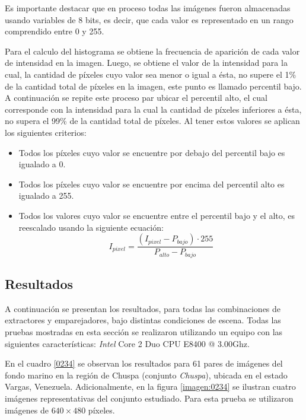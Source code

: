 Es importante destacar que en proceso todas las imágenes fueron almacenadas usando variables de 8 bits, es decir, que cada valor es representado en un rango comprendido entre 0 y 255.

Para el calculo del histograma se obtiene la frecuencia de aparición de cada valor de intensidad en la imagen. Luego, se obtiene el valor de la intensidad para la cual, la cantidad de píxeles cuyo valor sea menor o igual a ésta, no supere el 1\% de la cantidad total de píxeles en la imagen, este punto es llamado percentil bajo. A continuación se repite este proceso par ubicar el percentil alto, el cual corresponde con la intensidad para la cual la cantidad de píxeles inferiores a ésta, no supera el 99\% de la cantidad total de píxeles. Al tener estos valores se aplican los siguientes criterios:

\begin{itemize}
	\item Todos los píxeles cuyo valor se encuentre por debajo del percentil bajo es igualado a 0.
	\item Todos los píxeles cuyo valor se encuentre por encima del percentil alto es igualado a 255.
	\item Todos los valores cuyo valor se encuentre entre el percentil bajo y el alto, es reescalado usando la siguiente ecuación: 
	\begin{displaymath}
		I_{pixel} = \frac{(I_{pixel} - P_{bajo}) \cdot 255}{P_{alto} - P_{bajo}}
	\end{displaymath}
\end{itemize}


\subsection{Resultados}

A continuación se presentan los resultados, para todas las combinaciones de extractores y emparejadores, bajo distintas condiciones de escena. Todas las pruebas mostradas en esta sección se realizaron utilizando un equipo con las siguientes características:  \textit{Intel\textsuperscript \textregistered } Core 2 Duo CPU E8400 @ 3.00Ghz.

En el cuadro \ref{0234} se observan los resultados para 61 pares de imágenes del fondo marino en la región de Chuspa (conjunto \textit{Chuspa}), ubicada en el estado Vargas, Venezuela. Adicionalmente, en la figura \ref{imagen:0234} se ilustran cuatro imágenes representativas del conjunto estudiado. Para esta prueba se utilizaron imágenes de $640\times480$ píxeles.


